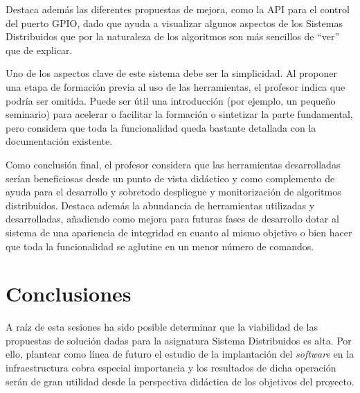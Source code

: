 Destaca además las diferentes propuestas de mejora, como la API para el control del puerto GPIO, dado que ayuda a visualizar algunos aspectos de los Sistemas Distribuidos que por la naturaleza de los algoritmos son más sencillos de ``ver'' que de explicar.

Uno de los aspectos clave de este sistema debe ser la simplicidad. Al proponer una etapa de formación previa al uso de las herramientas, el profesor indica que podría ser omitida. Puede ser útil una introducción (por ejemplo, un pequeño seminario) para acelerar o facilitar la formación o sintetizar la parte fundamental, pero considera que toda la funcionalidad queda bastante detallada con la documentación existente. 

Como conclusión final, el profesor considera que las herramientas desarrolladas serían beneficiosas desde un punto de vista didáctico y como complemento de ayuda para el desarrollo y sobretodo despliegue y monitorización de algoritmos distribuidos. Destaca además la abundancia de herramientas utilizadas y desarrolladas, añadiendo como mejora para futuras fases de desarrollo dotar al sistema de una apariencia de integridad en cuanto al mismo objetivo o bien hacer que toda la funcionalidad se aglutine en un menor número de comandos.

\section{Conclusiones}

A raíz de esta sesiones ha sido posible determinar que la viabilidad de las propuestas de solución dadas para la asignatura Sistema Distribuidos es alta. Por ello, plantear como línea de futuro el estudio de la implantación del \textit{software} en la infraestructura cobra especial importancia y los resultados de dicha operación serán de gran utilidad desde la perspectiva didáctica de los objetivos del proyecto.


